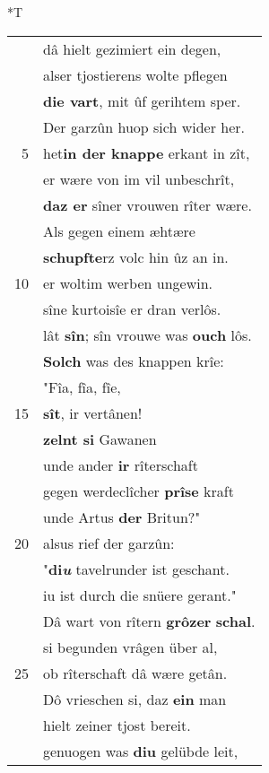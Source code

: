 \documentclass[8pt,a4paper,notitlepage]{article}
\begin{document}
\begin{table}[ht]
\begin{minipage}[t]{0.5\linewidth}
\end{minipage}
\hspace{0.5cm}
\begin{minipage}[t]{0.5\linewidth}
\small
\begin{center}*T
\end{center}
\begin{tabular}{rl}
 & dâ hielt gezimiert ein degen,\\ 
 & alser tjostierens wolte pflegen\\ 
 & \textbf{die vart}, mit ûf gerihtem sper.\\ 
 & Der garzûn huop sich wider her.\\ 
5 & het\textbf{in der knappe} erkant in zît,\\ 
 & er wære von im vil unbeschrît,\\ 
 & \textbf{daz er} sîner vrouwen rîter wære.\\ 
 & Als gegen einem æhtære\\ 
 & \textbf{schupfte}rz volc hin ûz an in.\\ 
10 & er woltim werben ungewin.\\ 
 & sîne kurtoisîe er dran verlôs.\\ 
 & lât \textbf{sîn}; sîn vrouwe was \textbf{ouch} lôs.\\ 
 & \textbf{Solch} was des knappen krîe:\\ 
 & "Fîa, fîa, fîe,\\ 
15 & \textbf{sît}, ir vertânen!\\ 
 & \textbf{zelnt si} Gawanen\\ 
 & unde ander \textbf{ir} rîterschaft\\ 
 & gegen werdeclîcher \textbf{prîse} kraft\\ 
 & unde Artus \textbf{der} Britun?"\\ 
20 & alsus rief der garzûn:\\ 
 & "\textbf{di\textit{u}} tavelrunder ist geschant.\\ 
 & iu ist durch die snüere gerant."\\ 
 & Dâ wart von rîtern \textbf{grôzer} \textbf{schal}.\\ 
 & si begunden vrâgen über al,\\ 
25 & ob rîterschaft dâ wære getân.\\ 
 & Dô vrieschen si, daz \textbf{ein} man\\ 
 & hielt zeiner tjost bereit.\\ 
 & genuogen was \textbf{diu} gelübde leit,\\ 

\end{tabular}
\end{minipage}
\end{table}
\end{document}
